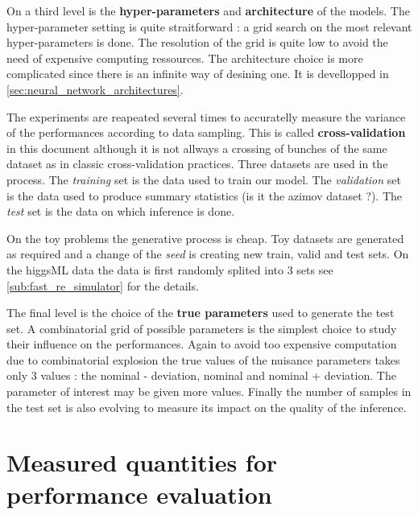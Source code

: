 On a third level is the \textbf{hyper-parameters} and \textbf{architecture} of the models.
The hyper-parameter setting is quite straitforward : a grid search on the most relevant hyper-parameters is done.
The resolution of the grid is quite low to avoid the need of expensive computing ressources.
The architecture choice is more complicated since there is an infinite way of desining one.
It is devellopped in \autoref{sec:neural_network_architectures}.

The experiments are reapeated several times to accuratelly measure the variance of the performances according to data sampling.
This is called \textbf{cross-validation} in this document although it is not allways a crossing of bunches of the same dataset as in classic cross-validation practices.
Three datasets are used in the process.
The \emph{training} set is the data used to train our model.
The \emph{validation} set is the data used to produce summary statistics (is it the azimov dataset ?).
The \emph{test} set is the data on which inference is done.

On the toy problems the generative process is cheap.
Toy datasets are generated as required and a change of the \emph{seed} is creating new train, valid and test sets.
On the higgsML data the data is first randomly splited into 3 sets see \autoref{sub:fast_re_simulator} for the details.

The final level is the choice of the \textbf{true parameters} used to generate the test set.
A combinatorial grid of possible parameters is the simplest choice to study their influence on the performances.
Again to avoid too expensive computation due to combinatorial explosion the true values of the nuisance parameters takes only 3 values :
the nominal - deviation, nominal and nominal + deviation.
The parameter of interest may be given more values.
Finally the number of samples in the test set is also evolving to measure its impact on the quality of the inference.










\section{Measured quantities for performance evaluation} %
\label{sec:measured_quantities_for_performance_evaluation}


